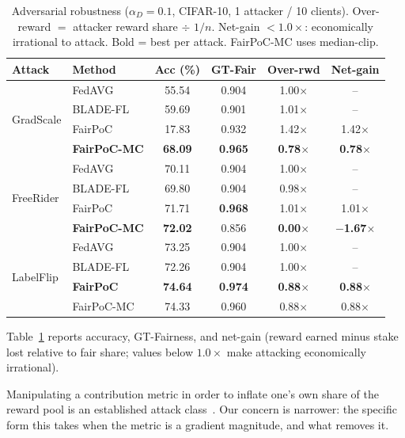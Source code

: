 \documentclass[conference]{IEEEtran}
\theoremstyle{remark}
\begin{document}
\begin{table}[t]
\caption{Adversarial robustness ($\alpha_D{=}0.1$, CIFAR-10, 1 attacker / 10 clients).
Over-reward $=$ attacker reward share $\div$ $1/n$.
Net-gain ${<}1.0{\times}$: economically irrational to attack.
Bold = best per attack. FairPoC-MC uses median-clip.}
\label{tab:adversarial}
\centering
\renewcommand{\arraystretch}{1.1}
\setlength{\tabcolsep}{3pt}
\begin{tabular}{llcccc}
\toprule
\textbf{Attack} & \textbf{Method} & \textbf{Acc (\%)} & \textbf{GT-Fair} & \textbf{Over-rwd} & \textbf{Net-gain} \\
\midrule
\multirow{4}{*}{GradScale}
 & FedAVG         & 55.54 & 0.904 & 1.00$\times$ & -- \\
 & BLADE-FL       & 59.69 & 0.901 & 1.01$\times$ & -- \\
 & FairPoC        & 17.83 & 0.932 & 1.42$\times$ & 1.42$\times$ \\
 & \textbf{FairPoC-MC} & \textbf{68.09} & \textbf{0.965} & \textbf{0.78}$\times$ & \textbf{0.78}$\times$ \\
\midrule
\multirow{4}{*}{FreeRider}
 & FedAVG         & 70.11 & 0.904 & 1.00$\times$ & -- \\
 & BLADE-FL       & 69.80 & 0.904 & 0.98$\times$ & -- \\
 & FairPoC        & 71.71 & \textbf{0.968} & 1.01$\times$ & 1.01$\times$ \\
 & \textbf{FairPoC-MC} & \textbf{72.02} & 0.856 & \textbf{0.00}$\times$ & \textbf{$-$1.67}$\times$ \\
\midrule
\multirow{4}{*}{LabelFlip}
 & FedAVG         & 73.25 & 0.904 & 1.00$\times$ & -- \\
 & BLADE-FL       & 72.26 & 0.904 & 1.00$\times$ & -- \\
 & \textbf{FairPoC}    & \textbf{74.64} & \textbf{0.974} & \textbf{0.88}$\times$ & \textbf{0.88}$\times$ \\
 & FairPoC-MC     & 74.33 & 0.960 & 0.88$\times$ & 0.88$\times$ \\
\bottomrule
\end{tabular}
\end{table}

Table~\ref{tab:adversarial} reports accuracy, GT-Fairness, and
net-gain (reward earned minus stake lost relative to fair share; values
below $1.0\times$ make attacking economically irrational).

Manipulating a contribution metric in order to inflate one's own share
of the reward pool is an established attack
class~\cite{ace2024attack, fragility2025contrib}. Our concern is
narrower: the specific form this takes when the metric is a gradient
magnitude, and what removes it.
\end{document}
